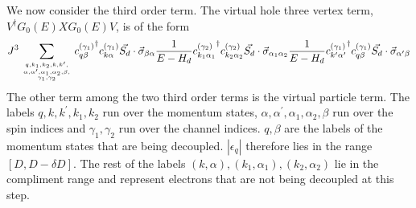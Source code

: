 We now consider the third order term. The virtual hole three vertex term, \(V^\dagger G_0(E)XG_0(E)V\), is of the form
\begin{equation}\begin{aligned}
	J^3\sum_{q,k_1,k_2,k,k^\prime,\atop{\alpha,\alpha^\prime,\alpha_1,\alpha_2,\beta,\atop{\gamma_1,\gamma_2}}}{c^{(\gamma_1)}_{q\beta}}^\dagger {c^{(\gamma_1)}_{k\alpha}}\vec{S_d}\cdot\vec{\sigma}_{\beta \alpha} \frac{1}{E - H_d} {c^{(\gamma_2)}_{k_1 \alpha_1}}^\dagger c_{k_2 \alpha_2}^{(\gamma_2)}\vec{S_d}\cdot\vec{\sigma}_{\alpha_1 \alpha_2} \frac{1}{E - H_d} {c^{(\gamma_1)}_{k^\prime\alpha^\prime}}^\dagger {c^{(\gamma_1)}_{q\beta}}\vec{S_d}\cdot\vec{\sigma}_{\alpha^\prime \beta}
\end{aligned}\end{equation}
The other term among the two third order terms is the virtual particle term. The labels \(q,k,k^\prime,k_1,k_2\) run over the momentum states, \(\alpha,\alpha^\prime,\alpha_1,\alpha_2,\beta\) run over the spin indices and \(\gamma_1,\gamma_2\) run over the channel indices. \(q,\beta\) are the labels of the momentum states that are being decoupled. \(|\epsilon_q|\) therefore lies in the range \(\left[D, D - \delta D\right] \). The rest of the labels \((k,\alpha),(k_1,\alpha_1),(k_2,\alpha_2)\) lie in the compliment range and represent electrons that are not being decoupled at this step.

